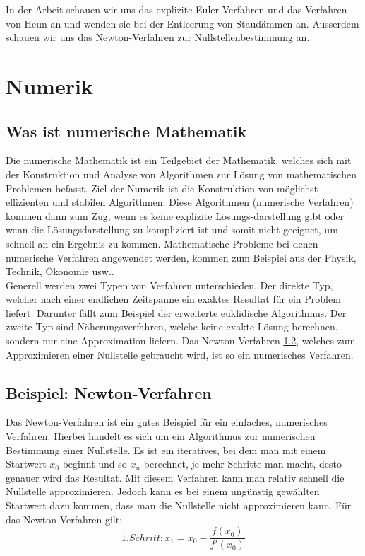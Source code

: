 \documentclass[a4paper,12pt]{report}
\begin{document}
\noindent
In der Arbeit schauen wir uns das explizite Euler-Verfahren und das Verfahren von Heun an und wenden sie bei der Entleerung von Staudämmen an. Ausserdem schauen wir uns das Newton-Verfahren zur Nullstellenbestimmung an.

\chapter{Numerik}
\section{Was ist numerische Mathematik}
Die numerische Mathematik ist ein Teilgebiet der Mathematik, welches sich mit der Konstruktion und Analyse von Algorithmen zur Lösung von mathematischen Problemen befasst. Ziel der Numerik ist die Konstruktion von möglichst effizienten und stabilen Algorithmen. Diese Algorithmen (numerische Verfahren) kommen dann zum Zug, wenn es keine explizite Lösungs-darstellung gibt oder wenn die Lösungsdarstellung zu kompliziert ist und somit nicht geeignet, um schnell an ein Ergebnis zu kommen. Mathematische Probleme bei denen numerische Verfahren angewendet werden, kommen zum Beispiel aus der Physik, Technik, Ökonomie usw.. \cite[Harbrecht S.5]{Harbrecht} \cite[Numerik-Mathepedia]{Mathepedia} \\

\noindent
Generell werden zwei Typen von Verfahren unterschieden. Der direkte Typ, welcher nach einer endlichen Zeitspanne ein exaktes Resultat für ein Problem liefert. Darunter fällt zum Beispiel der erweiterte euklidische Algorithmus. Der zweite Typ sind Näherungsverfahren, welche keine exakte Lösung berechnen, sondern nur eine Approximation liefern. Das Newton-Verfahren \ref{Newton}, welches zum Approximieren einer Nullstelle gebraucht wird, ist so ein numerisches Verfahren. \cite[Numerik-Mathepedia]{Mathepedia}

\section{Beispiel: Newton-Verfahren} \label{Newton}
Das Newton-Verfahren ist ein gutes Beispiel für ein einfaches, numerisches Verfahren. Hierbei handelt es sich um ein Algorithmus zur numerischen Bestimmung einer Nullstelle. Es ist ein iteratives, bei dem man mit einem Startwert $x_0$ beginnt und so $x_n$ berechnet, je mehr Schritte man macht, desto genauer wird das Resultat. Mit diesem Verfahren kann man relativ schnell die Nullstelle approximieren. Jedoch kann es bei einem ungünstig gewählten Startwert dazu kommen, dass man die Nullstelle nicht approximieren kann. \cite[StudyHelp]{Newton-Verfahren}
\noindent
Für das Newton-Verfahren gilt: 
\begin{equation*}
1.Schritt: x_1 = x_0 - \frac{f(x_0)}{f'(x_0)}
\end{equation*}
\end{document}
